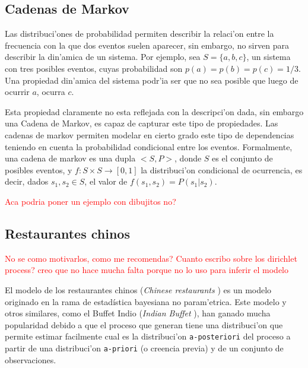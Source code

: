 \subsection{Cadenas de Markov}
Las distribuci'ones de probabilidad permiten describir la relaci'on entre la frecuencia con la que dos eventos suelen aparecer, 
sin embargo, no sirven para describir la din'amica de un sistema. Por ejemplo, sea $S = \{a, b, c\}$, un sistema con tres posibles eventos, 
cuyas probabilidad son $p(a) = p(b) = p(c) = 1/3$. Una propiedad din'amica del sistema podr'ia ser que no sea posible que luego 
de ocurrir $a$, ocurra $c$. 

Esta propiedad claramente no esta reflejada con la descripci'on dada, sin embargo una Cadena de Markov, 
es capaz de capturar este tipo de propiedades.
Las cadenas de markov permiten modelar en cierto grado este tipo de dependencias teniendo en cuenta la probabilidad condicional entre
los eventos.
\newline \newline
Formalmente, una cadena de markov es una dupla $<S,P>$, donde $S$ es el conjunto de posibles eventos, y $f : S \times S \rightarrow [0,1]$ la 
distribuci'on condicional de ocurrencia, es decir, dados $s_1, s_2 \in S$, el valor de $f(s_1, s_2) = P(s_1 | s_2)$. 

\textcolor{red}{Aca podria poner un ejemplo con dibujitos no?} 


\subsection{Restaurantes chinos}
\textcolor{red}{No se como motivarlos, como me recomendas?}\newline 
\textcolor{red}{Cuanto escribo sobre los dirichlet process? creo que no hace mucha falta porque no lo uso para inferir el modelo} 

El modelo de los restaurantes chinos (\emph{Chinese restaurants} \cita) es un modelo originado en la rama de estad\'istica bayesiana no param'etrica.
Este modelo y otros similares, como el Buffet Indio (\emph{Indian Buffet} \cita), han ganado mucha popularidad debido a que el proceso que generan
tiene una distribuci'on que permite estimar facilmente cual es la distribuci'on \texttt{a-posteriori} del proceso a partir de una distribuci'on 
\texttt{a-priori} (o creencia previa) y de un conjunto de observaciones.


